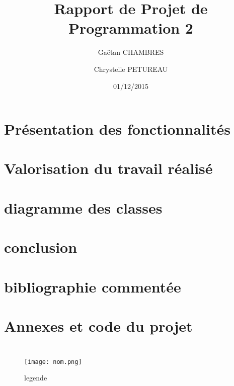 \documentclass{report}
\begin{document}
\lstset{language=C}
\title{Rapport de Projet de Programmation 2}
\author{Ga\"{e}tan CHAMBRES
\and
Chrystelle PETUREAU}
\date{01/12/2015}
\maketitle
\tableofcontents


\chapter{Présentation des fonctionnalités}
\chapter{Valorisation du travail réalisé}
\chapter{diagramme des classes}
\chapter{conclusion}
\chapter{bibliographie commentée}
\chapter{Annexes et code du projet}


\section{}

\subsection{}

\begin{lstlisting}[frame=single]

\end{lstlisting}

\begin{figure}[!h]
\caption{legende}
\centering
\texttt{[image: nom.png]}
\end{figure}
\end{document}
